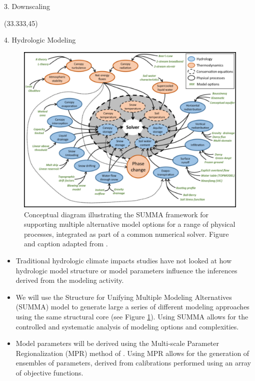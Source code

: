 \documentclass{beamer}
\begin{document}
\begin{frame}{}
\begin{columns}
\begin{column}{.3333\paperwidth}
\begin{textblock}{\textwidth \TPHorizModule}
\begin{block}{3. Downscaling}
    \end{block}

   \end{textblock}



   \begin{textblock}{\textwidth \TPHorizModule}(33.333,45)
    \begin{block}{4. Hydrologic Modeling}

     \begin{figure}
      \center\includegraphics[width=0.6\linewidth]{figures/summa.png}
      \caption{Conceptual diagram illustrating the SUMMA framework for supporting multiple alternative model options for a range of physical processes, integrated as part of a common numerical solver. Figure and caption adapted from \citet{Clark_2015}.}
      \label{fig:summa}
     \end{figure}

     \begin{itemize}
      \justifying
      \item Traditional hydrologic climate impacts studies have not looked at how hydrologic model structure or model parameters influence the inferences derived from the modeling activity.
      \item We will use the Structure for Unifying Multiple Modeling Alternatives (SUMMA) model \citep{Clark_2015} to generate large a series of different modeling approaches using the same structural core (see Figure \ref{fig:summa}). Using SUMMA allows for the controlled and systematic analysis of modeling options and complexities.
      \item Model parameters will be derived using the Multi-scale Parameter Regionalization (MPR) method of \citet{Samaniego_2010}. Using MPR allows for the generation of ensembles of parameters, derived from calibrations performed using an array of objective functions.
     \end{itemize}


\end{block}
\end{textblock}
\end{column}
\end{columns}
\end{frame}
\end{document}
